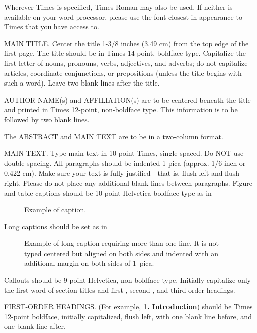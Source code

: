 \documentclass[times, 10pt,twocolumn]{article}
\begin{document}




Wherever Times is specified, Times Roman may also be used. If neither is 
available on your word processor, please use the font closest in 
appearance to Times that you have access to.

MAIN TITLE. Center the title 1-3/8 inches (3.49 cm) from the top edge of 
the first page. The title should be in Times 14-point, boldface type. 
Capitalize the first letter of nouns, pronouns, verbs, adjectives, and 
adverbs; do not capitalize articles, coordinate conjunctions, or 
prepositions (unless the title begins with such a word). Leave two blank 
lines after the title.

AUTHOR NAME(s) and AFFILIATION(s) are to be centered beneath the title 
and printed in Times 12-point, non-boldface type. This information is to 
be followed by two blank lines.

The ABSTRACT and MAIN TEXT are to be in a two-column format. 

MAIN TEXT. Type main text in 10-point Times, single-spaced. Do NOT use 
double-spacing. All paragraphs should be indented 1 pica (approx. 1/6 
inch or 0.422 cm). Make sure your text is fully justified---that is, 
flush left and flush right. Please do not place any additional blank 
lines between paragraphs. Figure and table captions should be 10-point 
Helvetica boldface type as in
\begin{figure}[h]
   \caption{Example of caption.}
\end{figure}

\noindent Long captions should be set as in 
\begin{figure}[h] 
   \caption{Example of long caption requiring more than one line. It is 
     not typed centered but aligned on both sides and indented with an 
     additional margin on both sides of 1~pica.}
\end{figure}

\noindent Callouts should be 9-point Helvetica, non-boldface type. 
Initially capitalize only the first word of section titles and first-, 
second-, and third-order headings.

FIRST-ORDER HEADINGS. (For example, {\large \bf 1. Introduction}) 
should be Times 12-point boldface, initially capitalized, flush left, 
with one blank line before, and one blank line after.
\end{document}
